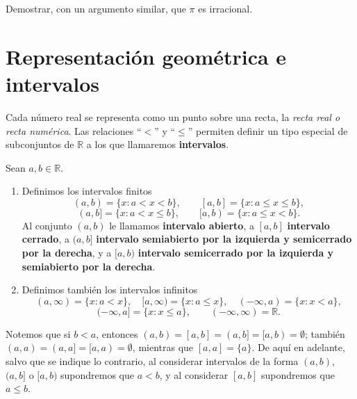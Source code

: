 \documentclass[12pt,a4paper]{book}
\begin{document}
  \begin{problema}
    Demostrar, con un argumento similar, que $\pi$ es irracional.
  \end{problema}
  
  \section{Representación geométrica e intervalos}
  
  Cada número real se representa como un punto sobre una recta, la \emph{recta real o recta numérica}. Las relaciones ``$<$'' y ``$\leq$'' permiten definir un tipo especial de subconjuntos de $\mathbb{R}$ a los que llamaremos \textbf{intervalos}.
  
  \begin{definicion}[Intervalos]
    Sean $a,b \in \mathbb{R}$.
    \begin{enumerate}[label=(\alph*)]
      \item Definimos los intervalos finitos
            \begin{equation*}
              (a,b) = \{x : a<x<b\}, \qquad [a,b] = \{x : a \leq x \leq b\},
            \end{equation*}
            \begin{equation*}
              (a,b] = \{x : a<x\leq b\}, \qquad [a,b) = \{x : a \leq x <b\}.
            \end{equation*}
            Al conjunto $(a,b)$ le llamamos \textbf{intervalo abierto}, a $[a,b]$ \textbf{intervalo cerrado}, a $(a,b]$ \textbf{intervalo semiabierto por la izquierda y semicerrado por la derecha}, y a $[a,b)$ \textbf{intervalo semicerrado por la izquierda y semiabierto por la derecha}.
      \item Definimos también los intervalos infinitos
            \begin{equation*}
              (a,\infty) = \{x : a<x\}, \quad [a,\infty) = \{x : a \leq x\}, \quad (-\infty,a) = \{x : x<a\},
            \end{equation*}
            \begin{equation*}
              (-\infty,a] = \{x : x \leq a\}, \qquad (-\infty,\infty) = \mathbb{R}.
            \end{equation*}
    \end{enumerate}
  \end{definicion}
  
  Notemos que si $b<a$, entonces $(a,b)=[a,b]=(a,b]=[a,b)=\emptyset$; también $(a,a)=(a,a]=[a,a)=\emptyset$, mientras que $[a,a]=\{a\}$. De aquí en adelante, salvo que se indique lo contrario, al considerar intervalos de la forma $(a,b)$, $(a,b]$ o $[a,b)$ supondremos que $a<b$, y al considerar $[a,b]$ supondremos que $a \leq b$.
  
\end{document}

